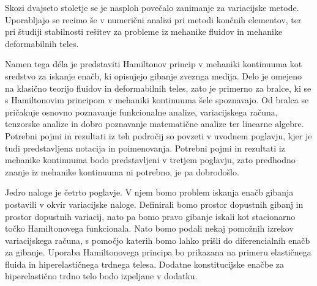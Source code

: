 Skozi dvajseto stoletje se je nasploh povečalo zanimanje za variacijske metode.
Uporabljajo se recimo še
v numerični analizi pri metodi končnih elementov, ter pri študiji stabilnosti
rešitev za probleme iz mehanike fluidov in mehanike deformabilnih teles.

Namen tega déla je predstaviti Hamiltonov princip v mehaniki kontinuuma
kot sredstvo za iskanje enačb, ki opisujejo gibanje zveznga medija.
Delo je omejeno na klasično teorijo fluidov in deformabilnih teles,
zato je primerno za bralce, ki se s Hamiltonovim principom v mehaniki
kontinuuma šele spoznavajo. Od bralca se pričakuje osnovno poznavanje
funkcionalne analize, variacijskega računa, tenzorske analize in
dobro poznavanje matematične analize ter linearne algebre.
Potrebni pojmi in rezultati iz teh področij so povzeti v uvodnem
poglavju, kjer je tudi predstavljena notacija in poimenovanja.
Potrebni pojmi in rezultati iz mehanike kontinuuma bodo predstavljeni v tretjem
poglavju, zato predhodno znanje iz mehanike kontinuuma ni potrebno,
je pa dobrodošlo.

Jedro naloge je četrto poglavje. V njem bomo problem iskanja enačb gibanja
postavili v okvir variacijske naloge. Definirali bomo prostor dopustnih gibanj in
prostor dopustnih variacij, nato pa bomo pravo gibanje iskali kot stacionarno
točko Hamiltonovega funkcionala. Nato bomo podali nekaj pomožnih
izrekov variacijskega računa, s pomočjo katerih bomo lahko prišli do
diferencialnih enačb za gibanje. Uporaba Hamiltonovega principa
bo prikazana na primeru elastičnega fluida in hiperelastičnega trdnega telesa.
Dodatne konstitucijske enačbe za hiperelastično trdno telo bodo izpeljane v dodatku.
